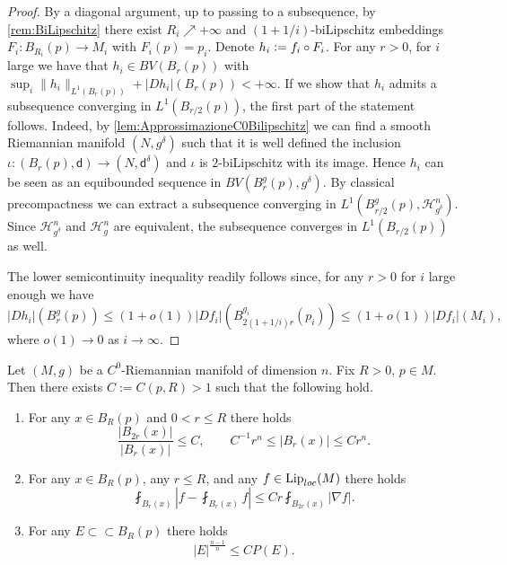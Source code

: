 \documentclass[a4paper,12pt,reqno]{amsart}
\numberwithin{equation}{section}
\theoremstyle{plain}
\theoremstyle{definition}
\theoremstyle{remark}
\newcommand{\eqdef}{\ensuremath{\vcentcolon=}}
\newcommand{\haus}{\mathcal{H}}
\newcommand{\dist}{\mathsf{d}}
\begin{document}
{\begin{proof}
By a diagonal argument, up to passing to a subsequence, by \cref{rem:BiLipschitz} there exist  $R_i\nearrow+\infty$ and $(1+1/i)$-biLipschitz embeddings $F_i: B_{R_i}(p)\to M_i$ with $F_i(p)=p_i$. Denote $h_i\eqdef f_i\circ F_i$. For any $r>0$, for $i$ large we have that $h_i \in BV(B_r(p))$ with $\sup_i \| h_i\|_{L^1(B_r(p))} + |D h_i|(B_r(p)) <+\infty$. If we show that $h_i$ admits a subsequence converging in $L^1(B_{r/2}(p))$, the first part of the statement follows. Indeed, by \cref{lem:ApprossimazioneC0Bilipschitz} we can find a smooth Riemannian manifold $(N,g^\delta)$ such that it is well defined the inclusion $\iota:(B_r(p),\dist) \to (N,\dist^\delta)$ and $\iota$ is $2$-biLipschitz with its image. Hence $h_i$ can be seen as an equibounded sequence in $BV(B_r^g(p), g^\delta)$. By classical precompactness we can extract a subsequence converging in $L^1(B_{r/2}^g(p), \haus^n_{g^\delta})$. Since $\haus^n_{g^\delta}$ and $\haus^n_g$ are equivalent, the subsequence converges in $L^1(B_{r/2}(p))$ as well.

The lower semicontinuity inequality readily follows since, for any $r>0$ for $i$ large enough we have
\[
|D h_i|(B_r^g(p)) \le (1+o(1))|D f_i| (B_{2(1+1/i)r}^{g_i}(p_i)) \le (1+o(1))|D f_i| (M_i),
\]
where $o(1)\to0$ as $i\to\infty$.    
\end{proof}

\begin{lemma}\label{lem:TechnicalLemmaC0Manifold}
    Let $(M,g)$ be a $C^0$-Riemannian manifold of dimension $n$. Fix $R>0$, $p\in M$. Then there exists $C:=C(p,R)>1$ such that the following hold.
    \begin{enumerate}
        \item For any $x\in B_R(p)$ and $0<r\leq R$ there holds
        \[
        \frac{|B_{2r}(x)|}{|B_r(x)|} \le C,
        \qquad
        C^{-1}r^n \leq |B_r(x)|\leq Cr^n.
        \]
    
        \item For any $x\in B_R(p)$, any $r\leq R$, and any $f\in\mathrm{Lip}_{\rm loc}(M)$ there holds
        \begin{equation}\label{eq:PoincareOnC0metric}
        \fint_{B_r(x)}\left|f-\fint_{B_r(x)}f\right|\leq Cr\fint_{B_{2r}(x)}|\nabla f|.
        \end{equation}
        
        \item For any $E\subset\subset  B_{R}(p)$ there holds
        \begin{equation}\label{eq:isoperimetricLocaleC0metric}
            |E|^{\frac{n-1}{n}}\leq CP(E).
        \end{equation}
    \end{enumerate}
\end{lemma}

}
\end{document}

